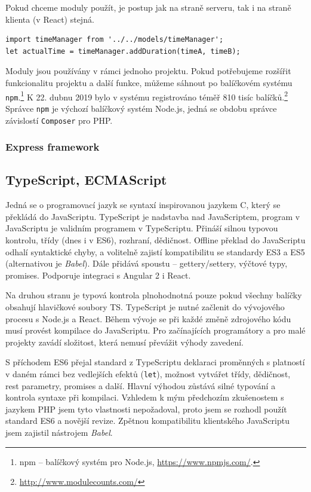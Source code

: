 Pokud chceme moduly použít, je postup jak na straně serveru, tak i na straně klienta (v React) stejná.
\begin{lstlisting}[style=JavaScript]
import timeManager from '../../models/timeManager';
let actualTime = timeManager.addDuration(timeA, timeB);
\end{lstlisting}

Moduly jsou používány v rámci jednoho projektu. Pokud potřebujeme rozšířit funkcionalitu projektu a další funkce, můžeme sáhnout po balíčkovém systému \texttt{npm}.\footnote{npm -- balíčkový systém pro Node.js, \url{https://www.npmjs.com/}.} K 22. dubnu 2019 bylo v systému registrováno téměř 810 tisíc balíčků.\footnote{\url{http://www.modulecounts.com/}} Správce \texttt{npm} je výchozí balíčkový systém Node.js, jedná se obdobu správce závislostí \texttt{Composer} pro PHP.

\subsubsection{Express framework}

\subsection{TypeScript, ECMAScript}
Jedná se o programovací jazyk se syntaxí inspirovanou jazykem C, který se překládá do JavaScriptu. TypeScript je nadstavba nad JavaScriptem, program v JavaScriptu je validním programem v TypeScriptu. Přináší silnou typovou kontrolu, třídy (dnes i v ES6), rozhraní, dědičnost. Offline překlad do JavaScriptu odhalí syntaktické chyby, a volitelně zajistí kompatibilitu se standardy ES3 a ES5 (alternativou je \textit{Babel}). Dále přidává spoustu  -- gettery/settery, výčtové typy, promises. Podporuje integraci s Angular 2 i React.

Na druhou stranu je typová kontrola plnohodnotná pouze pokud všechny balíčky obsahují hlavičkové soubory TS. TypeScript je nutné začlenit do vývojového procesu s Node.js a React. Během vývoje se při každé změně zdrojového kódu musí provést kompilace do JavaScriptu. Pro začínajících programátory a pro malé projekty zavádí složitost, která nemusí převážit výhody zavedení.

S příchodem ES6 přejal standard z TypeScriptu deklaraci proměnných s platností v daném rámci bez vedlejších efektů (\texttt{let}), možnost vytvářet třídy, dědičnost, rest parametry, promises a další. Hlavní výhodou zůstává silné typování a kontrola syntaxe při kompilaci. Vzhledem k mým předchozím zkušenostem s jazykem PHP jsem tyto vlastnosti nepožadoval, proto jsem se rozhodl použít standard ES6 a novější revize. Zpětnou kompatibilitu klientského JavaScriptu jsem zajistil nástrojem \textit{Babel}.

